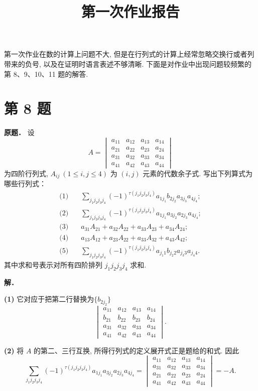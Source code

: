 \documentclass[UTF8,12pt]{ctexart}
\title{第一次作业报告}
\author{}
\date{}
\newcommand{\invn}{\tau}
\begin{document}
\maketitle

第一次作业在数的计算上问题不大, 但是在行列式的计算上经常忽略交换行或者列带来的负号, 以及在证明时语言表述不够清晰. 下面是对作业中出现问题较频繁的第 8、9、10、11 题的解答.
\section*{第 8 题}

\textbf{原题．}
设
\[
A=\begin{vmatrix}
a_{11}&a_{12}&a_{13}&a_{14}\\
a_{21}&a_{22}&a_{23}&a_{24}\\
a_{31}&a_{32}&a_{33}&a_{34}\\
a_{41}&a_{42}&a_{43}&a_{44}
\end{vmatrix}
\]
为四阶行列式, $A_{ij}\ (1\leq i,j\leq 4)$ 为 $(i,j)$ 元素的代数余子式. 写出下列算式为哪些行列式：
\begin{align*}
\text{(1)}\quad&
\sum_{j_1j_2j_3j_4}(-1)^{\invn(j_1j_2j_3j_4)}
a_{1j_1}b_{2j_2}a_{3j_3}a_{4j_4};\\
\text{(2)}\quad&
\sum_{j_1j_2j_3j_4}(-1)^{\invn(j_1j_2j_3j_4)}
a_{1j_1}a_{3j_2}a_{2j_3}a_{4j_4};\\
\text{(3)}\quad& a_{31}A_{21}+a_{32}A_{22}+a_{33}A_{23}+a_{34}A_{24};\\
\text{(4)}\quad& a_{13}A_{12}+a_{23}A_{22}+a_{33}A_{32}+a_{43}A_{42};\\
\text{(5)}\quad&
\sum_{j_1j_2j_3j_4}(-1)^{\invn(j_1j_2j_3j_4)}
a_{j_1 1}b_{j_2 2}a_{j_3 3}a_{j_4 4}.
\end{align*}
其中求和号表示对所有四阶排列 $j_1j_2j_3j_4$ 求和. 

\textbf{解．}

\textbf{(1)} 它对应于把第二行替换为$\{b_{2j_2}\}$
\[
\begin{vmatrix}
a_{11}&a_{12}&a_{13}&a_{14}\\
b_{21}&b_{22}&b_{23}&b_{24}\\
a_{31}&a_{32}&a_{33}&a_{34}\\
a_{41}&a_{42}&a_{43}&a_{44}
\end{vmatrix}.
\]

\textbf{(2)} 将 $A$ 的第二、三行互换, 所得行列式的定义展开式正是题给的和式. 因此
\[
\sum_{j_1j_2j_3j_4}(-1)^{\invn(j_1j_2j_3j_4)}
a_{1j_1}a_{3j_2}a_{2j_3}a_{4j_4}
=\begin{vmatrix}
a_{11}&a_{12}&a_{13}&a_{14}\\
a_{31}&a_{32}&a_{33}&a_{34}\\
a_{21}&a_{22}&a_{23}&a_{24}\\
a_{41}&a_{42}&a_{43}&a_{44}
\end{vmatrix}=-A.
\]
\end{document}
